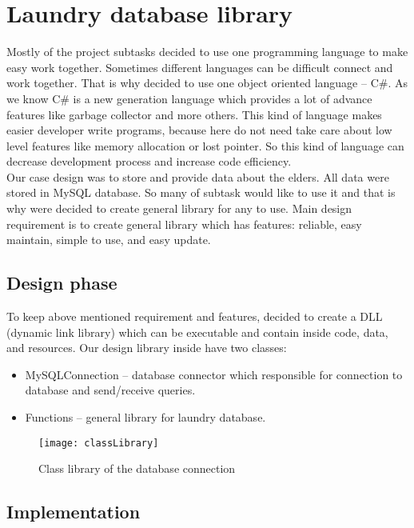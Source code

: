 %
\section{Laundry database library}

Mostly of the project subtasks decided to use one programming language to make easy work together. Sometimes different languages can be difficult connect and work together. That is why decided to use one object oriented language – C\#. As we know C\# is a new generation language which provides a lot of advance features like garbage collector and more others. This kind of language makes easier developer write programs, because here do not need take care about low level features like memory allocation or lost pointer. So this kind of language can decrease development process and increase code efficiency. \\
Our case design was to store and provide data about the elders. All data were stored in MySQL database. So many of subtask would like to use it and that is why were decided to create general library for any to use. Main design requirement is to create general library which has features:  reliable, easy maintain, simple to use, and easy update.

\subsection{Design phase}

To keep above mentioned requirement and features, decided to create a DLL (dynamic link library) which can be executable and contain inside code, data, and resources. Our design library inside have two classes:

\begin{itemize}
	\item MySQLConnection – database connector which responsible for connection to database and send/receive queries.
	\item Functions – general library for laundry database.
\end{itemize}

\begin{figure}[h]
	\centering
		\texttt{[image: classLibrary]}
	\caption{Class library of the database connection}
	\label{fig:planning}
\end{figure}

\newpage
\subsection{Implementation}

